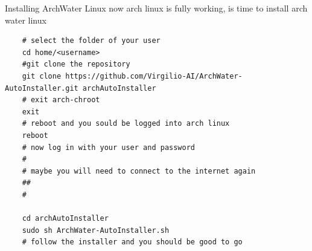 \newpage
\begin{section}{Installing ArchWater Linux}
now arch linux is fully working, is time to install arch water linux
\begin{verbatim}
	# select the folder of your user
	cd home/<username>
	#git clone the repository 
	git clone https://github.com/Virgilio-AI/ArchWater-AutoInstaller.git archAutoInstaller
	# exit arch-chroot
	exit
	# reboot and you sould be logged into arch linux
	reboot
	# now log in with your user and password
	#
	# maybe you will need to connect to the internet again
	##
	#

	cd archAutoInstaller
	sudo sh ArchWater-AutoInstaller.sh
	# follow the installer and you should be good to go
\end{verbatim}
\end{section}

